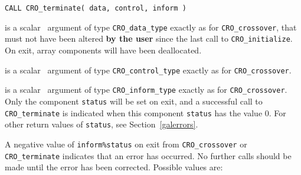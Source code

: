 \documentclass{galahad}
\newcommand{\packagename}{CRO}
\begin{document}
\hspace{8mm}
{\tt CALL \packagename\_terminate( data, control, inform )}

\vspace*{-3mm}
\begin{description}

 is a scalar \intentinout\ argument of type
{\tt \packagename\_data\_type}
exactly as for
{\tt \packagename\_crossover},
that must not have been altered {\bf by the user} since the last call to
{\tt \packagename\_initialize}.
On exit, array components will have been deallocated.

 is a scalar \intentin\ argument of type
{\tt \packagename\_control\_type}
exactly as for
{\tt \packagename\_crossover}.

 is a scalar \intentout\ argument of type
{\tt \packagename\_inform\_type}
exactly as for
{\tt \packagename\_crossover}.
Only the component {\tt status} will be set on exit, and a
successful call to
{\tt \packagename\_terminate}
is indicated when this  component {\tt status} has the value 0.
For other return values of {\tt status}, see Section~\ref{galerrors}.

\end{description}



\galerrors
A negative value of {\tt inform\%status} on exit from
{\tt \packagename\_crossover}
or
{\tt \packagename\_terminate}
indicates that an error has occurred. No further calls should be made
until the error has been corrected. Possible values are:
\end{document}
